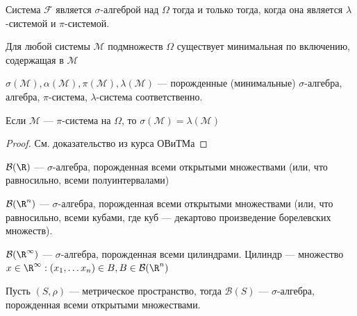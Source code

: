 \begin{theorem}
    Система \(\mathcal{F}\) является \(\sigma\)-алгеброй над \(\Omega\) тогда и только тогда, когда она является \(\lambda\)-системой и \(\pi\)-системой.
\end{theorem}

\begin{proposition}
    Для любой системы \(\mathcal{M}\) подмножеств \(\Omega\) существует минимальная по включению, содержащая в \(\mathcal{M}\)
\end{proposition}

\begin{note}
    \(\sigma(\mathcal{M}), \alpha(\mathcal{M}), \pi(\mathcal{M}), \lambda(\mathcal{M})\) --- порожденные (минимальные) \(\sigma\)-алгебра, алгебра, \(\pi\)-система, \(\lambda\)-система соответственно.
\end{note}

\begin{theorem}
    Если \(\mathcal{M}\) --- \(\pi\)-система на \(\Omega\), то \(\sigma(\mathcal{M}) = \lambda(\mathcal{M})\)
\end{theorem}
\begin{proof}
    См. доказательство из курса ОВиТМа
\end{proof}

\begin{example}
    \(\mathcal{B}(\R)\) --- \(\sigma\)-алгебра, порожденная всеми открытыми множествами (или, что равносильно, всеми полуинтервалами)
\end{example}

\begin{example}
    \(\mathcal{B}(\R^n)\) --- \(\sigma\)-алгебра, порожденная всеми открытыми множествами (или, что равносильно, всеми кубами, где куб --- декартово произведение борелевских множеств).
\end{example}

\begin{example}
    \(\mathcal{B}(\R^\infty)\) --- \(\sigma\)-алгебра, порожденная всеми цилиндрами. Цилиндр --- множество \({x \in \R^\infty : (x_1, \dots x_n) \in B}, B \in \mathcal{B}(\R^n)\)
\end{example}


\begin{example}
    Пусть \((S, \rho)\) --- метрическое пространство, тогда \(\mathcal{B}(S)\) --- \(\sigma\)-алгебра, порожденная всеми открытыми множествами.
\end{example}

